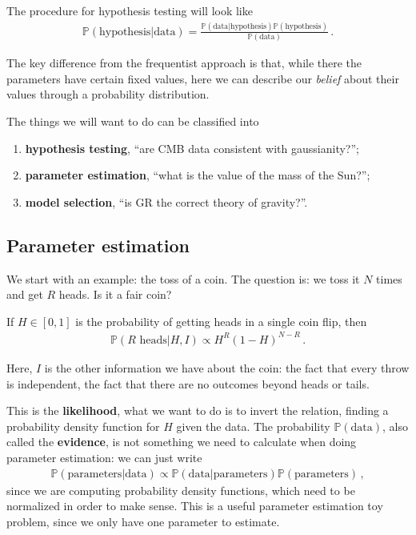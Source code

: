 \documentclass[main.tex]{subfiles}
\begin{document}

The procedure for hypothesis testing will look like 
%
\begin{align}
\mathbb{P}(\text{hypothesis} | \text{data})
= \frac{\mathbb{P}(\text{data} | \text{hypothesis}) \mathbb{P}(\text{hypothesis}) }{\mathbb{P}(\text{data})}
\,.
\end{align}

The key difference from the frequentist approach is that, while there the parameters have certain fixed values, here we can describe our \emph{belief} about their values through a probability distribution. 

The things we will want to do can be classified into 
\begin{enumerate}
    \item \textbf{hypothesis testing}, ``are CMB data consistent with gaussianity?'';
    \item \textbf{parameter estimation}, ``what is the value of the mass of the Sun?'';
    \item \textbf{model selection}, ``is GR the correct theory of gravity?''.
\end{enumerate}

\subsection{Parameter estimation}

We start with an example: the toss of a coin. 
The question is: we toss it \(N\) times and get \(R\) heads. Is it a fair coin?

If \(H \in [0,1]\) is the probability of getting heads in a single coin flip, then 
%
\begin{align}
\mathbb{P}(R \text{ heads} | H, I) \propto H^{R} (1 - H)^{N-R} 
\,.
\end{align}

Here, \(I\) is the other information we have about the coin: the fact that every throw is independent, the fact that there are no outcomes beyond heads or tails. 

This is the \textbf{likelihood}, what we want to do is to invert the relation, finding a probability density function for \(H\) given the data. The probability \(\mathbb{P}(\text{data})\), also called the \textbf{evidence}, is not something we need to calculate when doing parameter estimation: we can just write 
%
\begin{align}
\mathbb{P}(\text{parameters} | \text{data}) \propto \mathbb{P}(\text{data} | \text{parameters}) \mathbb{P}(\text{parameters})
\,,
\end{align}
%
since we are computing probability density functions, which need to be normalized in order to make sense. 
This is a useful parameter estimation toy problem, since we only have one parameter to estimate. 
\end{document}
